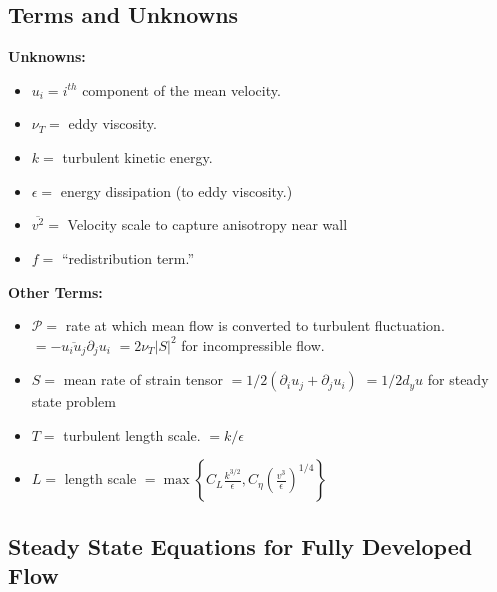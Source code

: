 \documentclass[12pt]{article}
\newcommand{\ep}{\epsilon} \newcommand{\noi}{\noindent}
\newcommand{\pr}{\partial}
\begin{document}
\subsection{Terms and Unknowns}

\textbf{Unknowns:}
\begin{itemize}
	\item $u_i = i^{th}$ component of the mean velocity. 
	\item $\nu_T = $ eddy viscosity.
	\item $k =$ turbulent kinetic energy. 
	\item $\ep =$ energy dissipation (to eddy viscosity.)
	\item $\overline{v^2} =$ Velocity scale to capture anisotropy near wall
	\item $f =$ ``redistribution term.''
\end{itemize}

\noi \textbf{Other Terms:} 
\begin{itemize}
	\item $\mathcal{P} = $ rate at which mean flow is converted to turbulent
		fluctuation. \newline
		$= - \overline{u_i u_j} \pr_j u_i$ \newline
		$= 2 \nu_T |S|^2$ for incompressible flow. 

	\item $S = $ mean rate of strain tensor \newline
		$= 1/2 ( \pr_i u_j + \pr_j u_i)$ \newline
		$= 1/2 d_y u$ for steady state problem
	\item $T = $ turbulent length scale. \newline
		$= k/\ep$ 
	\item $L = $ length scale \newline
		$= \max \left\{ C_L \frac{k^{3/2}}{\ep}, C_\eta (
		\frac{v^3}{\ep} )^{1/4} \right\}$
		
\end{itemize}

\subsection{Steady State Equations for Fully Developed Flow}
\end{document}
